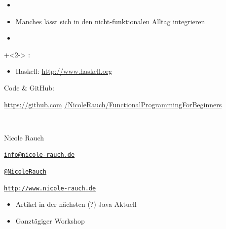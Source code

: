 \begin{frame}[fragile]{}
\begin{itemize}
\item {}
\item Manches lässt sich in den nicht-funktionalen Alltag integrieren
\item {}
\end{itemize}

\vfill

\onslide+<2->
:

\begin{itemize}
\item Haskell: \url{http://www.haskell.org}
\end{itemize}

\end{frame}




{
\begin{frame}{}

        Code \&  GitHub:
        \begin{center}
                \url{https://github.com} \url{/NicoleRauch/FunctionalProgrammingForBeginners}
        \end{center}

        ~\\[1em]
        \begin{block}{Nicole Rauch}
        \begin{description}[Twitterxx]
                \item[E-Mail]  \href{mailto:info@nicole-rauch.de}{\texttt{info@nicole-rauch.de}}
                \item[Twitter] \href{http://twitter.com/NicoleRauch}{\texttt{@NicoleRauch}}
                \item[Web] \href{http://www.nicole-rauch.de}{\texttt{http://www.nicole-rauch.de}}
        \end{description}
        \end{block}
        
        \begin{itemize}
	\item Artikel in der nächsten (?) Java Aktuell
	\item Ganztägiger Workshop
	\end{itemize}
\end{frame}
}
